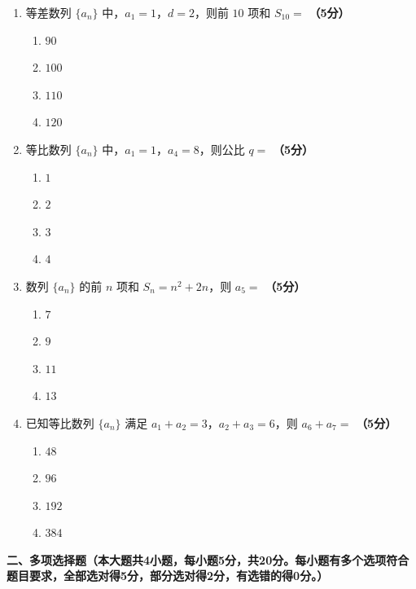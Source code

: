 \documentclass[12pt, a4paper]{ctexart}
\newcommand{\score}[1]{\hfill\textbf{（#1分）}}
\begin{document}
\begin{enumerate}
\item 等差数列 $\{a_n\}$ 中，$a_1=1$，$d=2$，则前 $10$ 项和 $S_{10}=$ \score{5}
\begin{enumerate}[label=\Alph*.]
\item $90$
\item $100$
\item $110$
\item $120$
\end{enumerate}

\item 等比数列 $\{a_n\}$ 中，$a_1=1$，$a_4=8$，则公比 $q=$ \score{5}
\begin{enumerate}[label=\Alph*.]
\item $1$
\item $2$
\item $3$
\item $4$
\end{enumerate}

\item 数列 $\{a_n\}$ 的前 $n$ 项和 $S_n=n^2+2n$，则 $a_5=$ \score{5}
\begin{enumerate}[label=\Alph*.]
\item $7$
\item $9$
\item $11$
\item $13$
\end{enumerate}

\item 已知等比数列 $\{a_n\}$ 满足 $a_1+a_2=3$，$a_2+a_3=6$，则 $a_6+a_7=$ \score{5}
\begin{enumerate}[label=\Alph*.]
\item $48$
\item $96$
\item $192$
\item $384$
\end{enumerate}
\end{enumerate}

\vspace{1em}

\noindent\textbf{二、多项选择题（本大题共4小题，每小题5分，共20分。每小题有多个选项符合题目要求，全部选对得5分，部分选对得2分，有选错的得0分。）}

\vspace{0.5em}
\end{document}
